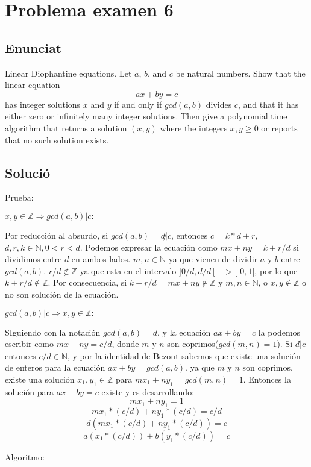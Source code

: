 \section{Problema examen 6}
\subsection{Enunciat}
Linear Diophantine equations. Let $a$, $b$, and $c$ be natural numbers. Show that the linear equation
\[
ax + by = c
\]
has integer solutions $x$ and $y$ if and only if $gcd(a,b)$ divides $c$, and that it has either zero or infinitely many integer solutions. Then give a polynomial time algorithm that returns a solution $(x,y)$ where the integers $x,y \geq 0$ or reports that no such solution exists.


\subsection{Solució}
Prueba:

$x,y \in \mathbb{Z} \Longrightarrow gcd(a,b) | c:$ 

Por reducción al absurdo, si $gcd(a,b) = d \not| c$, entonces $c = k*d + r$, $d,r,k \in \mathbb{N}, 0 < r < d$. Podemos expresar la ecuación como $mx + ny = k + r/d$ si dividimos entre $d$ en ambos lados. $m,n \in \mathbb{N}$ ya que vienen de dividir $a$ y $b$ entre $gcd(a,b)$. $r/d \not\in \mathbb{Z}$ ya que esta en el intervalo $]0/d, d/d[ -> ]0,1[$, por lo que $k+r/d \not\in \mathbb{Z}$. Por consecuencia, si $k+r/d=mx+ny \not\in \mathbb{Z}$ y $m,n \in \mathbb{N}$, o $x,y \not\in \mathbb{Z}$ o no son solución de la ecuación.



$gcd(a,b) | c \Longrightarrow x,y \in \mathbb{Z}:$ 

SIguiendo con la notación $gcd(a,b) = d$, y la ecuación $ax+by=c$ la podemos escribir como $mx+ny=c/d$, donde $m$ y $n$ son coprimos($gcd(m,n)=1$). Si $d|c$ entonces $c/d \in \mathbb{N}$, y por la identidad de Bezout sabemos que existe una solución de enteros para la ecuación $ax+by=gcd(a,b)$. ya que $m$ y $n$ son coprimos, existe una solución  $x_1,y_1 \in \mathbb{Z}$ para $mx_1+ny_1=gcd(m,n)=1$. Entonces la solución para $ax+by=c$ existe y es desarrollando:
\[
mx_1+ny_1=1
\]
\[
mx_1*(c/d)+ny_1*(c/d) = c/d
\]
\[
d(mx_1*(c/d)+ny_1*(c/d))=c
\]
\[
a(x_1*(c/d))+b(y_1*(c/d))=c
\]

Algoritmo:

